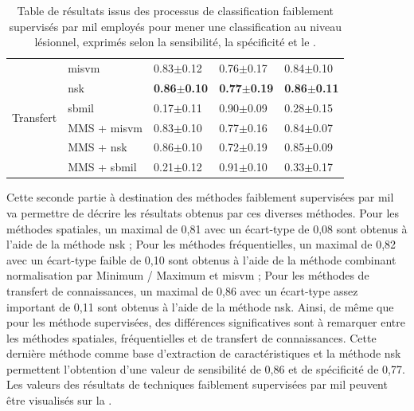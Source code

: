 \begin{table}[H]
\begin{tabular}{cllll}
        \multirow{6}{*}{Transfert}   & \gls{misvm}          & 0.83$\pm$0.12             & 0.76$\pm$0.17             & 0.84$\pm$0.10             \\
                                     & \gls{nsk}            & \textbf{0.86$\pm$0.10}    & \textbf{0.77$\pm$0.19}    & \textbf{0.86$\pm$0.11}    \\
                                     & \gls{sbmil}          & 0.17$\pm$0.11             & 0.90$\pm$0.09             & 0.28$\pm$0.15             \\
                                     & MMS + \gls{misvm}    & 0.83$\pm$0.10             & 0.77$\pm$0.16             & 0.84$\pm$0.07             \\
                                     & MMS + \gls{nsk}      & 0.86$\pm$0.10             & 0.72$\pm$0.19             & 0.85$\pm$0.09             \\
                                     & MMS + \gls{sbmil}    & 0.21$\pm$0.12             & 0.91$\pm$0.10             & 0.33$\pm$0.17             \\ \bottomrule
    \end{tabular}
    \caption{Table de résultats issus des processus de classification faiblement supervisés par \gls{mil} employés pour mener une classification au niveau lésionnel, exprimés selon la sensibilité, la spécificité et le \fscore{}.}
    \label{tab:results_lesion_classification_weakly_patient}
\end{table}
\clearpage

Cette seconde partie à destination des méthodes faiblement supervisées par \gls{mil} va permettre de décrire les résultats obtenus par ces diverses méthodes. Pour les méthodes spatiales, un \fscore{} maximal de 0,81 avec un écart-type de 0,08 sont obtenus à l'aide de la méthode \gls{nsk} ; Pour les méthodes fréquentielles, un \fscore{} maximal de 0,82 avec un écart-type faible de 0,10 sont obtenus à l'aide de la méthode combinant normalisation par Minimum / Maximum et \gls{misvm} ; Pour les méthodes de transfert de connaissances, un \fscore{} maximal de 0,86 avec un écart-type assez important de 0,11 sont obtenus à l'aide de la méthode \gls{nsk}. Ainsi, de même que pour les méthode supervisées, des différences significatives sont à remarquer entre les méthodes spatiales, fréquentielles et de transfert de connaissances. Cette dernière méthode comme base d'extraction de caractéristiques et la méthode \gls{nsk} permettent l'obtention d'une valeur de sensibilité de 0,86 et de spécificité de 0,77. Les valeurs des résultats de techniques faiblement supervisées par \gls{mil} peuvent être visualisés sur la .\par

